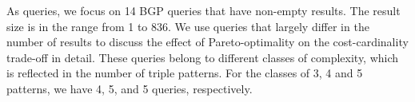As queries, we focus on 14 BGP queries that have non-empty results. The result size is in the range from 1 to 836. We use queries that largely differ in the number of results to discuss the effect of Pareto-optimality on the cost-cardinality trade-off in detail. These queries belong to different classes of complexity, which is reflected in the number of triple patterns. For the classes of 3, 4 and 5 patterns, we have 4, 5, and 5 queries, respectively. 





